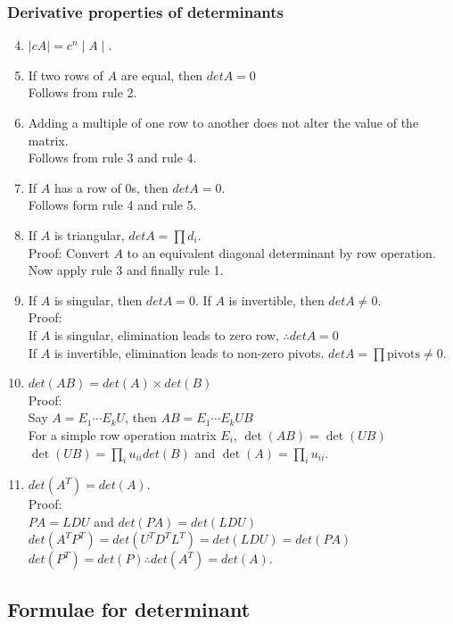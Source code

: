 \subsubsection{Derivative properties of determinants}
\begin{enumerate}
	\setcounter{enumi}{3}
	\item $\mid cA \mid = c^n \mid A \mid$.
	\item If two rows of $A$ are equal, then $det A = 0$\\
	Follows from rule 2.
	\item Adding a multiple of one row to another does not alter the value of the matrix.\\
	Follows from rule 3 and rule 4.
	\item If $A$ has a row of $0$s, then $det A = 0$.\\
	Follows form rule 4 and rule 5.
	\item If $A$ is triangular, $det A = \prod d_i$.\\
	Proof: Convert $A$ to an equivalent diagonal determinant by row operation. Now apply rule 3 and finally rule 1.
	\item If $A$ is singular, then $det A = 0$. If $A$ is invertible, then $detA \neq 0$.\\
	Proof:\\
	If $A$ is singular, elimination leads to zero row, $\therefore detA= 0$\\
	If $A$ is invertible, elimination leads to non-zero pivots. $detA = \prod \text{pivots} \neq 0$.
	\item $det(AB) = det(A)\times det(B)$\\
	Proof:\\
    Say $A = E_1\cdots E_k U$, then $AB = E_1\cdots E_k UB$\\
    For a simple row operation matrix $E_i$, $\det(AB) = \det(UB)$\\
    $\det(UB) = \prod_iu_{ii}det(B)$ and $\det(A) = \prod_{i}u_{ii}$.
	\item $det(A^T) = det(A)$.\\
	Proof:\\ 
	$PA = LDU$ and $det(PA) = det(LDU)$\\
	$det(A^TP^T) = det(U^TD^TL^T) = det (LDU) = det(PA)$\\
	$det(P^T) = det(P) \therefore det(A^T) = det(A)$.

\end{enumerate}


\subsection{Formulae for determinant}

